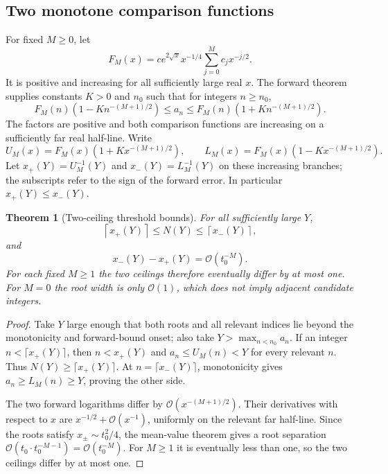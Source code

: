 \documentclass[11pt]{article}
\newtheorem{theorem}{Theorem}[section]
\theoremstyle{remark}\newtheorem{remark}[theorem]{Remark}
\newcommand{\OO}{\mathcal O}
\begin{document}
\subsection{Two monotone comparison functions}
For fixed $M\ge0$, let
\begin{equation}\label{rrm:eq:carrier}
 F_M(x)=ce^{2\sqrt x}x^{-1/4}\sum_{j=0}^Mc_jx^{-j/2}.
\end{equation}
It is positive and increasing for all sufficiently large real $x$. The forward theorem supplies constants $K>0$ and $n_0$ such that for integers $n\ge n_0$,
\begin{equation}\label{rrm:eq:carrierenvelope}
 F_M(n)(1-Kn^{-(M+1)/2})\le a_n
 \le F_M(n)(1+Kn^{-(M+1)/2}).
\end{equation}
The factors are positive and both comparison functions are increasing on a sufficiently far real half-line. Write
\[
 U_M(x)=F_M(x)(1+Kx^{-(M+1)/2}),\qquad
 L_M(x)=F_M(x)(1-Kx^{-(M+1)/2}).
\]
Let $x_+(Y)=U_M^{-1}(Y)$ and $x_-(Y)=L_M^{-1}(Y)$ on these increasing branches; the subscripts refer to the sign of the forward error. In particular $x_+(Y)\le x_-(Y)$.

\begin{theorem}[Two-ceiling threshold bounds]\label{rrm:thm:threshold}
For all sufficiently large $Y$,
\begin{equation}\label{rrm:eq:ceilbounds}
 \left\lceil x_+(Y)\right\rceil\le N(Y)
 \le\left\lceil x_-(Y)\right\rceil,
\end{equation}
and
\begin{equation}\label{rrm:eq:rootwidth}
 x_-(Y)-x_+(Y)=\OO(t_0^{-M}).
\end{equation}
For each fixed $M\ge1$ the two ceilings therefore eventually differ by at most one. For $M=0$ the root width is only $\OO(1)$, which does not imply adjacent candidate integers.
\end{theorem}
\begin{proof}
Take $Y$ large enough that both roots and all relevant indices lie beyond the monotonicity and forward-bound onset; also take $Y>\max_{n<n_0}a_n$. If an integer $n<\lceil x_+(Y)\rceil$, then $n<x_+(Y)$ and $a_n\le U_M(n)<Y$ for every relevant $n$. Thus $N(Y)\ge\lceil x_+(Y)\rceil$. At $n=\lceil x_-(Y)\rceil$, monotonicity gives $a_n\ge L_M(n)\ge Y$, proving the other side.

The two forward logarithms differ by $\OO(x^{-(M+1)/2})$. Their derivatives with respect to $x$ are $x^{-1/2}+\OO(x^{-1})$, uniformly on the relevant far half-line. Since the roots satisfy $x_\pm\sim t_0^2/4$, the mean-value theorem gives a root separation $\OO(t_0\cdot t_0^{-M-1})=\OO(t_0^{-M})$. For $M\ge1$ it is eventually less than one, so the two ceilings differ by at most one.
\end{proof}
\end{document}
